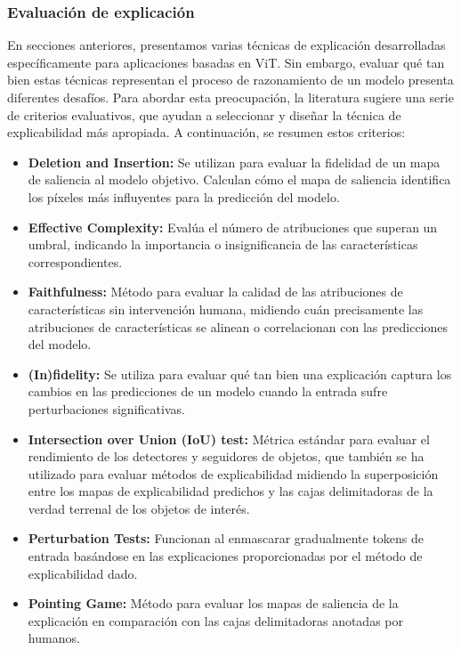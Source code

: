 \subsubsection{Evaluación de explicación}
En secciones anteriores, presentamos varias técnicas de explicación desarrolladas específicamente para aplicaciones basadas en ViT. Sin embargo, evaluar qué tan bien estas técnicas representan el proceso de razonamiento de un modelo presenta diferentes desafíos. Para abordar esta preocupación, la literatura sugiere una serie de criterios evaluativos, que ayudan a seleccionar y diseñar la técnica de explicabilidad más apropiada. A continuación, se resumen estos criterios:
\begin{itemize}
	\item \textbf{Deletion and Insertion:} Se utilizan para evaluar la fidelidad de un mapa de saliencia al modelo objetivo. Calculan cómo el mapa de saliencia identifica los píxeles más influyentes para la predicción del modelo.
	\item \textbf{Effective Complexity:} Evalúa el número de atribuciones que superan un umbral, indicando la importancia o insignificancia de las características correspondientes.
	
	\item \textbf{Faithfulness:} Método para evaluar la calidad de las atribuciones de características sin intervención humana, midiendo cuán precisamente las atribuciones de características se alinean o correlacionan con las predicciones del modelo.
	
	\item \textbf{(In)fidelity:} Se utiliza para evaluar qué tan bien una explicación captura los cambios en las predicciones de un modelo cuando la entrada sufre perturbaciones significativas.
	
	\item \textbf{Intersection over Union (IoU) test:} Métrica estándar para evaluar el rendimiento de los detectores y seguidores de objetos, que también se ha utilizado para evaluar métodos de explicabilidad midiendo la superposición entre los mapas de explicabilidad predichos y las cajas delimitadoras de la verdad terrenal de los objetos de interés.
	
	\item \textbf{Perturbation Tests:} Funcionan al enmascarar gradualmente tokens de entrada basándose en las explicaciones proporcionadas por el método de explicabilidad dado.
	
	\item \textbf{Pointing Game:} Método para evaluar los mapas de saliencia de la explicación en comparación con las cajas delimitadoras anotadas por humanos.
	

\end{itemize}
